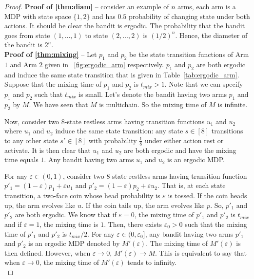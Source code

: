 \begin{proof}
    \textbf{Proof of \ref{thm:diam}} -- consider an example of $n$ arms, each arm is a MDP with state space $\{1,2\}$ and has $0.5$ probability of changing state under both actions.
    It should be clear the bandit is ergodic.
    The probability that the bandit goes from state $(1,\dots,1)$ to state $(2,\dots,2)$ is $(1/2)^n$.
    Hence, the diameter of the bandit is $2^n$.
    \medskip \\

    \textbf{Proof of \ref{thm:mixing}} -- Let $p_1$ and $p_2$ be the state transition functions of Arm $1$ and Arm $2$ given in \figurename~\ref{fig:ergodic_arm} respectively.
    $p_1$ and $p_2$ are both ergodic and induce the same state transition that is given in Table~\ref{tab:ergodic_arm}.
    Suppose that the mixing time of $p_1$ and $p_2$ is $t_{mix}>1$.
    Note that we can specify $p_1$ and $p_2$ such that $t_{mix}$ is small.
    Let's denote the bandit having two arms $p_1$ and $p_2$ by $M$.
    We have seen that $M$ is multichain.
    So the mixing time of $M$ is infinite.

    Now, consider two 8-state restless arms having transition functions $u_1$ and $u_2$ where $u_1$ and $u_2$ induce the same state transition: any state $s\in[8]$ transitions to any other state $s'\in[8]$ with probability $\frac18$ under either action rest or activate.
    It is then clear that $u_1$ and $u_2$ are both ergodic and have the mixing time equals $1$.
    Any bandit having two arms $u_1$ and $u_2$ is an ergodic MDP.

    For any $\varepsilon\in(0,1)$, consider two 8-state restless arms having transition function $p'_1=(1-\varepsilon)p_1+\varepsilon u_1$ and $p'_2=(1-\varepsilon)p_2+\varepsilon u_2$.
    That is, at each state transition, a two-face coin whose head probability is $\varepsilon$ is tossed.
    If the coin heads up, the arm evolves like $u$.
    If the coin tails up, the arm evolves like $p$.
    So, $p'_1$ and $p'_2$ are both ergodic.
    We know that if $\varepsilon=0$, the mixing time of $p'_1$ and $p'_2$ is $t_{mix}$ and if $\varepsilon=1$, the mixing time is $1$.
    Then, there exists $\varepsilon_0>0$ such that the mixing time of $p'_1$ and $p'_2$ is $t_{mix}/2$.
    For any $\varepsilon\in(0,\varepsilon_0]$, any bandit having two arms $p'_1$ and $p'_2$ is an ergodic MDP denoted by $M'(\varepsilon)$.
    The mixing time of $M'(\varepsilon)$ is then defined.
    However, when $\varepsilon\to0$, $M'(\varepsilon)\to M$.
    This is equivalent to say that when $\varepsilon\to0$, the mixing time of $M'(\varepsilon)$ tends to infinity.
    \medskip \\


\end{proof}

